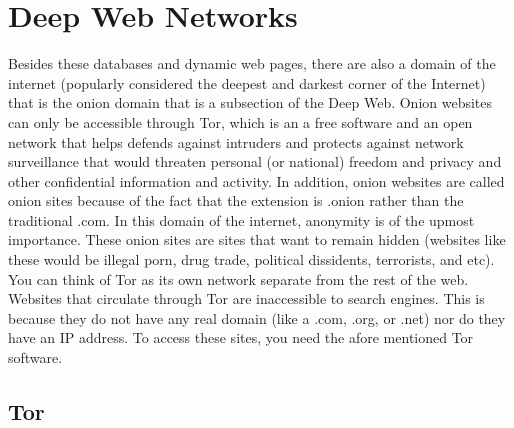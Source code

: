 \documentclass[twocolumn,letterpaper,10pt]{article}
\begin{document}
\section{Deep Web Networks}

Besides these databases and dynamic web pages, there are also a domain of the internet (popularly considered the deepest and darkest corner of the Internet) that is the onion domain that is a subsection of the Deep Web. Onion websites can only be accessible through Tor, which is an a free software and an open network that helps defends against intruders and protects against network surveillance that would threaten personal (or national) freedom and privacy and other confidential information and activity. In addition, onion websites are called onion sites because of the fact that the extension is .onion rather than the traditional .com. In this domain of the internet, anonymity is of the upmost importance. These onion sites are sites that want to remain hidden (websites like these would be illegal porn, drug trade, political dissidents, terrorists, and etc). You can think of Tor as its own network separate from the rest of the web. Websites that circulate through Tor are inaccessible to search engines. This is because they do not have any real domain (like a .com, .org, or .net) nor do they have an IP address. To access these sites, you need the afore mentioned Tor software. 

\subsection{Tor}
\end{document}
